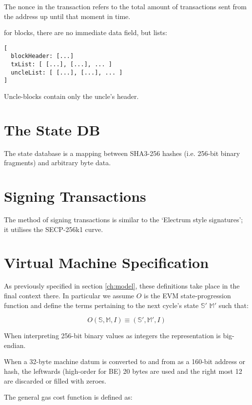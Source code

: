 \documentclass[9pt,oneside]{amsart}
\begin{document}
The nonce in the transaction refers to the total amount of transactions sent from the address up until that moment in time.

for blocks, there are no immediate data field, but lists:

\begin{verbatim}
[
  blockHeader: [...]
  txList: [ [...], [...], ... ]
  uncleList: [ [...], [...], ... ]
]
\end{verbatim}

Uncle-blocks contain only the uncle's header.

\section{The State DB}\label{app:state}

The state database is a mapping between SHA3-256 hashes (i.e. 256-bit binary fragments) and arbitrary byte data.

\section{Signing Transactions}\label{app:signing}

The method of signing transactions is similar to the `Electrum style signatures'; it utilises the SECP-256k1 curve.

\section{Virtual Machine Specification}\label{app:vm}

As previously specified in section \ref{ch:model}, these definitions take place in the final context there. In particular we assume $O$ is the EVM state-progression function and define the terms pertaining to the next cycle's state $\mathbb{S}'$ $\mathbb{M}'$ such that:

\begin{equation}
O(\mathbb{S}, \mathbb{M}, I) \equiv (\mathbb{S}', \mathbb{M}', I)
\end{equation}

When interpreting 256-bit binary values as integers the representation is big-endian.

When a 32-byte machine datum is converted to and from as a 160-bit address or hash, the leftwards (high-order for BE) 20 bytes are used and the right most 12 are discarded or filled with zeroes.

The general gas cost function is defined as:
\end{document}
